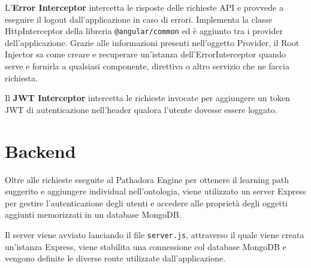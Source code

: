 \vspace{5mm}

L'\textbf{Error Interceptor} intercetta le risposte delle richieste API e provvede a eseguire il logout dall'applicazione in caso di errori. Implementa la classe HttpInterceptor della libreria \texttt{@angular/common} ed è aggiunto tra i provider dell'applicazione. Grazie alle informazioni presenti nell'oggetto Provider, il Root Injector sa come creare e recuperare un'istanza dell'ErrorInterceptor quando serve e fornirla a qualsiasi componente, direttiva o altro servizio che ne faccia richiesta.

\vspace{5mm}

Il \textbf{JWT Interceptor} intercetta le richieste invocate per aggiungere un token JWT di autenticazione nell'header qualora l'utente dovesse essere loggato.

\section{Backend}
Oltre alle richieste eseguite al Pathadora Engine per ottenere il learning path suggerito e aggiungere individual nell'ontologia, viene utilizzato un server Express per gestire l'autenticazione degli utenti e accedere alle proprietà degli oggetti aggiunti memorizzati in un database MongoDB.

Il server viene avviato lanciando il file \texttt{server.js}, attraverso il quale viene creata un'istanza Express, viene stabilita una connessione col database MongoDB e vengono definite le diverse route utilizzate dall'applicazione.

